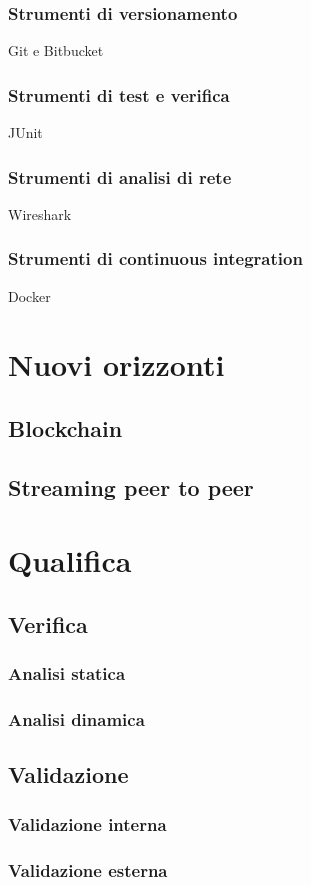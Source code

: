 				\subsubsection{Strumenti di versionamento}
			Git e Bitbucket
				\subsubsection{Strumenti di test e verifica}
			JUnit
				\subsubsection{Strumenti di analisi di rete}
			Wireshark
				\subsubsection{Strumenti di continuous integration}
			Docker
\section{Nuovi orizzonti}
	\subsection{Blockchain}
	\subsection{Streaming peer to peer}

\section{Qualifica}
	\subsection{Verifica}
				\subsubsection{Analisi statica}
				\subsubsection{Analisi dinamica}
	\subsection{Validazione}
				\subsubsection{Validazione interna}
				\subsubsection{Validazione esterna}